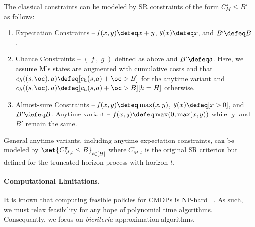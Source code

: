 \documentclass[pdftex, a4paper, 12pt]{article}
\newcommand{\jeremy}[1]{\textcolor{red}{#1}}
\DeclareMathOperator*{\f}{\mathit{f}}
\DeclareMathOperator*{\g}{\mathit{g}}
\begin{document}
\begin{proposition}[SR Modeling]\label{prop: modeling}
    The classical constraints can be modeled by SR constraints of the form $C_M^{\pi} \leq B'$ as follows:
    \begin{enumerate}
        \item Expectation Constraints -- $\f(x,y) \defeq x+y$, $\g(x) \defeq x$, and $B' \defeq B$.
        \item Chance Constraints -- $(\f,\g)$ defined as above and $B' \defeq \delta$. Here, we assume M's states are augmented with cumulative costs and that $c_h((s,\oc), a) \defeq [c_h(s,a) + \oc > B]$ for the anytime variant and $c_h((s,\oc), a) \defeq [c_h(s,a) + \oc > B][h = H]$ otherwise.
        \item Almost-sure Constraints -- $\f(x,y) \defeq \max(x,y)$, $\g(x) \defeq [x > 0]$, and $B' \defeq B$. Anytime variant -- $\f(x,y) \defeq \max(0, \max(x,y))$ while $\g$ and $B'$ remain the same. 
    \end{enumerate} 
    General anytime variants, including anytime expectation constraints, can be modeled by $\set{C^{\pi}_{M,t} \leq B}_{t \in [H]}$ where $C^{\pi}_{M,t}$ is the original SR criterion but defined for the truncated-horizon process with horizon $t$. 
\end{proposition}


    

\paragraph{Computational Limitations.} It is known that computing feasible policies for CMDPs is NP-hard ~\cite{dcRL, acRL}. As such, we must relax feasibility for any hope of polynomial time algorithms. Consequently, we focus on \emph{bicriteria} approximation algorithms.
\end{document}

